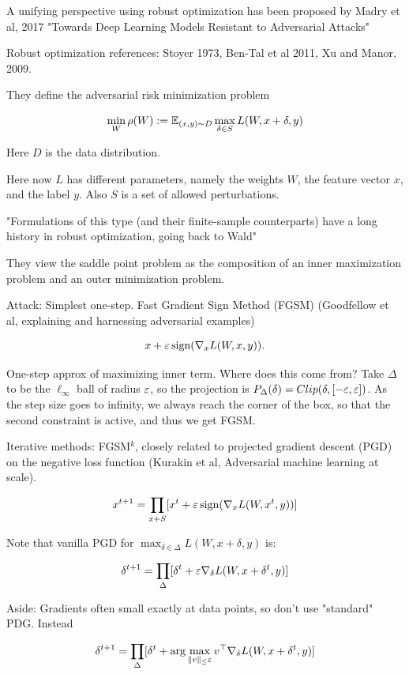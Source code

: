 \documentclass[english]{article}
\begin{document}
\item A unifying perspective using robust optimization has been proposed by Madry et al, 2017 "Towards Deep Learning Models Resistant to Adversarial Attacks"

Robust optimization references: Stoyer 1973, Ben-Tal et al 2011, Xu and Manor, 2009. 

They define the adversarial risk minimization problem

$$
\min_W \rho(W):=\mathbb{E}_{(x,y)\sim D} \max_{\delta\in S} L(W,x+\delta,y)
$$

Here $D$ is the data distribution.

Here now $L$ has different parameters, namely the weights $W$, the feature vector $x$, and the label $y$. Also $S$ is a set of allowed perturbations. 

"Formulations of this type (and their finite-sample counterparts) have a long history in robust optimization, going back to Wald"

They view the saddle point problem as the composition of an inner maximization problem and an outer minimization problem.

\benum 
\item  Attack: Simplest one-step. Fast Gradient Sign Method (FGSM) (Goodfellow et al, explaining and harnessing adversarial examples)

$$x + \varepsilon \operatorname{sign}(\nabla_x L(W,x,y)).$$

One-step approx of maximizing inner term. Where does this come from? Take $\Delta$ to be the $\ell_\infty$ ball of radius $\varepsilon$, so the projection is $P_\Delta(\delta) = Clip(\delta,[-\varepsilon,\varepsilon])$. As the step size goes to infinity, we always reach the corner of the box, so that the second constraint is active, and thus we get FGSM.

Iterative methods: FGSM$^k$, closely related to projected gradient descent (PGD) on the negative loss function (Kurakin et al, Adversarial machine learning at scale). 

$$x^{t+1} = \prod_{x+S}[x^t+ \varepsilon \operatorname{sign}(\nabla_x L(W,x^t,y))]$$ 

Note that vanilla PGD for $\max_{\delta\in\Delta} L(W,x+\delta,y)$ is: 

$$\delta^{t+1}=\prod_{\Delta}[\delta^t+\varepsilon \nabla_\delta L(W,x+\delta^t,y)]$$ 


Aside: Gradients often small exactly at data points, so don't use "standard" PDG. Instead


$$\delta^{t+1}=\prod_{\Delta}[\delta^t+
\arg\max_{\|v\|_\le \varepsilon} v^\top \nabla_\delta L(W,x+\delta^t,y)]$$
\end{document}
